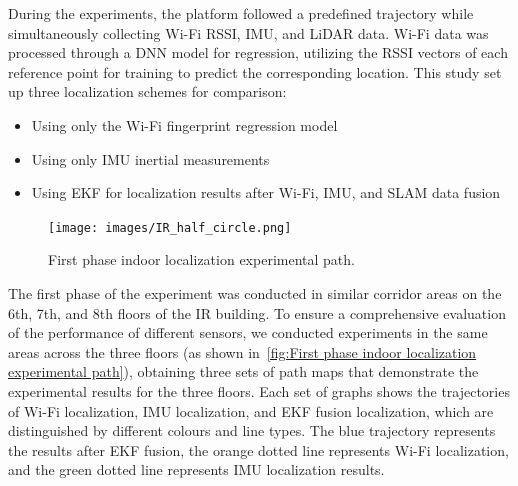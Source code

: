 \documentclass[12pt,a4paper]{article}
\numberwithin{equation}{section}
\begin{document}
During the experiments, the platform followed a predefined trajectory while
simultaneously collecting Wi-Fi RSSI, IMU, and LiDAR data. Wi-Fi data was
processed through a DNN model for regression, utilizing the RSSI vectors of each
reference point for training to predict the corresponding location. This study
set up three localization schemes for comparison:
\begin{itemize}
\item Using only the Wi-Fi fingerprint regression model
\item Using only IMU inertial measurements
\item Using EKF for localization results after Wi-Fi, IMU, and SLAM data fusion
\end{itemize}
\begin{figure}[H]
  \centering
  \texttt{[image: images/IR\_half\_circle.png]}
  \caption{First phase indoor localization experimental path.}
  \label{fig:First phase indoor localization experimental path}
\end{figure}

The first phase of the experiment was conducted in similar corridor areas on the
6th, 7th, and 8th floors of the IR building. To ensure a comprehensive
evaluation of the performance of different sensors, we conducted experiments in
the same areas across the three floors (as shown in~\autoref{fig:First phase
  indoor localization experimental path}), obtaining three sets of path maps
that demonstrate the experimental results for the three floors. Each set of
graphs shows the trajectories of Wi-Fi localization, IMU localization, and EKF
fusion localization, which are distinguished by different colours and line
types. The blue trajectory represents the results after EKF fusion, the orange
dotted line represents Wi-Fi localization, and the green dotted line represents
IMU localization results.
\end{document}
